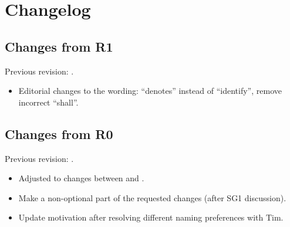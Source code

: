 \section{Changelog}
\subsection{Changes from R1}
Previous revision: \parencite{P0964R1}.
\begin{itemize}
  \item Editorial changes to the wording: “denotes” instead of “identify”, remove incorrect “shall”.
\end{itemize}
\subsection{Changes from R0}
Previous revision: \parencite{P0964R0}.
\begin{itemize}
    \item Adjusted to changes between \cite{P0214R8} and \cite{N4744}.
    \item Make  a non-optional part of the requested changes (after SG1 discussion).
    \item Update motivation after resolving different naming preferences with Tim.
\end{itemize}
